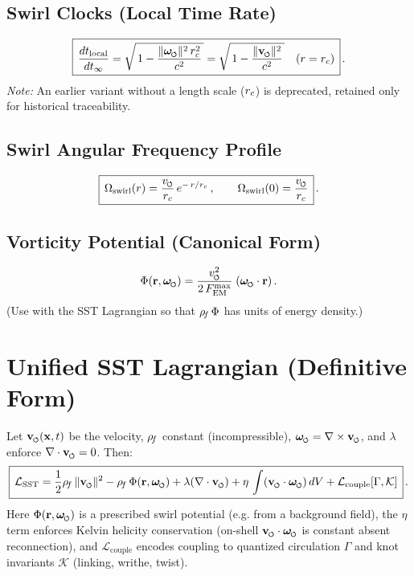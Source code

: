 \documentclass[11pt]{article}
\begin{document}
\subsection*{Swirl Clocks (Local Time Rate)}
    \[
        \boxed{\,\frac{dt_{\text{local}}}{dt_{\infty}}
            = \sqrt{\,1 - \frac{\|\omegas\|^2\,\rc^2}{c^2}\,}
            = \sqrt{\,1 - \frac{\|\vswirl\|^2}{c^2}\,}\quad (r=\rc)\,}\,.
    \]
    \emph{Note:} An earlier variant without a length scale ($r_c$) is deprecated, retained only for historical traceability.

\subsection*{Swirl Angular Frequency Profile}
    \[
        \boxed{\,\Omega_{\text{swirl}}(r) = \frac{\vscore}{\rc}\,e^{-\,r/\rc}\,,\qquad \Omega_{\text{swirl}}(0)=\frac{\vscore}{\rc}\,}\,.
    \]

\subsection*{Vorticity Potential (Canonical Form)}
    \[
        \Phi(\mathbf{r},\omegas) = \frac{\vscore^2}{2\,F_{\text{EM}}^{\max}}\;(\omegas\cdot \mathbf{r})\,.
    \]
    (Use with the SST Lagrangian so that $\rho_{\!f}\,\Phi$ has units of energy density.)

\section{Unified SST Lagrangian (Definitive Form)}
\label{sec:lagrangian}
Let $\vswirl(\mathbf{x},t)$ be the velocity, $\rho_{\!f}$ constant (incompressible), $\omegas = \nabla\times\vswirl$, and $\lambda$ enforce $\nabla\cdot\vswirl=0$. Then:
\[
    \boxed{\,\mathcal{L}_{\text{SST}} = \frac{1}{2}\rhof\,\|\vswirl\|^2 - \rhof\,\Phi(\mathbf{r},\omegas) + \lambda(\nabla\cdot\vswirl) + \eta\,\int (\vswirl\cdot\omegas)\,dV + \mathcal{L}_{\text{couple}}[\Gamma,\mathcal{K}]\,}\,.
\]
Here $\Phi(\mathbf{r},\omegas)$ is a prescribed swirl potential (e.g. from a background field), the $\eta$ term enforces Kelvin helicity conservation (on-shell $\vswirl\cdot\omegas$ is constant absent reconnection), and $\mathcal{L}_{\text{couple}}$ encodes coupling to quantized circulation $\Gamma$ and knot invariants $\mathcal{K}$ (linking, writhe, twist).

\end{document}
